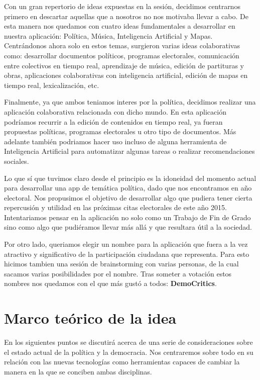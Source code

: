 Con un gran repertorio de ideas expuestas en la sesión, decidimos centrarnos primero en descartar aquellas que a nosotros no nos motivaba llevar a cabo. De esta manera nos quedamos con cuatro ideas fundamentales a desarrollar en nuestra aplicación: Política, Música, Inteligencia Artificial y Mapas. Centrándonos ahora solo en estos temas, surgieron varias ideas colaborativas como: desarrollar documentos políticos, programas electorales, comunicación entre colectivos en tiempo real, aprendizaje de música, edición de partituras y obras, aplicaciones colaborativas con inteligencia artificial, edición de mapas en tiempo real, lexicalización, etc.

Finalmente, ya que ambos teniamos interes por la política, decidimos realizar una aplicación colaborativa relacionada con dicho mundo. En esta aplicación podríamos recurrir a la edición de contenidos en tiempo real, ya fueran propuestas políticas, programas electorales u otro tipo de documentos. Más adelante también podriamos hacer uso incluso de alguna herramienta de Inteligencia Artificial para automatizar algunas tareas o realizar recomendaciones sociales.

Lo que sí que tuvimos claro desde el principio es la idoneidad del momento actual para desarrollar una app de temática política, dado que nos encontramos en año electoral. Nos propusimos el objetivo de desarrollar algo que pudiera tener cierta repercusión y utilidad en las próximas citas electorales de este año 2015. Intentariamos pensar en la aplicación no solo como un Trabajo de Fin de Grado sino como algo que pudiéramos llevar más allá y que resultara útil a la sociedad.

Por otro lado, queriamos elegir un nombre para la aplicación que fuera a la vez atractivo y significativo de la participación ciudadana que representa. Para esto hicimos tambien una sesión de brainstorming con varias personas, de la cual sacamos varias posibilidades por el nombre. Tras someter a votación estos nombres nos quedamos con el que más gustó a todos: \textbf{DemoCritics}.

\section{Marco teórico de la idea}

En los siguientes puntos se discutirá acerca de una serie de consideraciones sobre el estado actual de la política y la democracia. Nos centraremos sobre todo en su relación con las nuevas tecnologías como herramientas capaces de cambiar la manera en la que se conciben ambas disciplinas.

